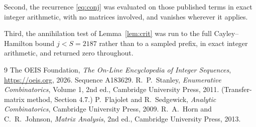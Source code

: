 \documentclass[11pt,a4paper]{article}
\theoremstyle{plain}
\theoremstyle{definition}
\begin{document}
Second, the recurrence \eqref{eq:conj} was evaluated on those published terms in exact
integer arithmetic, with no matrices involved, and vanishes wherever it applies.

Third, the annihilation test of Lemma~\ref{lem:crit} was run to the full Cayley--Hamilton
bound $j<S=2187$ rather than to a sampled prefix, in exact integer arithmetic, and returned
zero throughout.

\begin{thebibliography}{9}
 The OEIS Foundation, \emph{The On-Line Encyclopedia of Integer
Sequences}, \url{https://oeis.org}, 2026. Sequence A183629.
 R.~P.~Stanley, \emph{Enumerative Combinatorics}, Volume 1, 2nd ed.,
Cambridge University Press, 2011. (Transfer-matrix method, Section 4.7.)
 P.~Flajolet and R.~Sedgewick, \emph{Analytic Combinatorics}, Cambridge
University Press, 2009.
 R.~A.~Horn and C.~R.~Johnson, \emph{Matrix Analysis}, 2nd ed., Cambridge
University Press, 2013.
\end{thebibliography}
\end{document}
